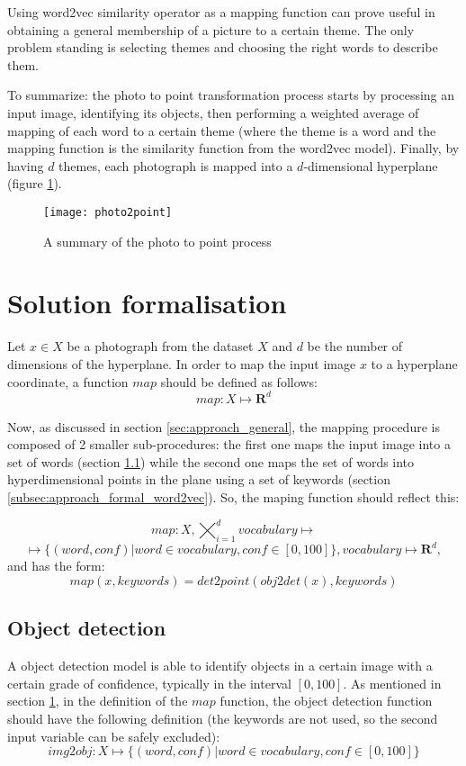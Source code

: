 Using word2vec similarity operator as a mapping function can prove useful in obtaining a general membership of a picture to a certain theme. The only problem standing is selecting themes and choosing the right words to describe them.

To summarize: the photo to point transformation process starts by processing an input image, identifying its objects, then performing a weighted average of mapping of each word to a certain theme (where the theme is a word and the mapping function is the similarity function from the word2vec model). Finally, by having $d$ themes, each photograph is mapped into a $d$-dimensional hyperplane (figure \ref{fig:photo2point}).

\begin{figure}[b!]
\centering
\texttt{[image: photo2point]}
\caption{A summary of the photo to point process}
\label{fig:photo2point}
\end{figure}

\section{Solution formalisation}
\label{sec:approach_formal}

Let $x \in X$ be a photograph from the dataset $X$ and $d$ be the number of dimensions of the hyperplane. In order to map the input image $x$ to a hyperplane coordinate, a function $map$ should be defined as follows:
$$ map : X \mapsto \mathbf{R}^{d} $$

Now, as discussed in section \ref{sec:approach_general}, the mapping procedure is composed of 2 smaller sub-procedures: the first one maps the input image into a set of words (section \ref{subsec:approach_formal_obj}) while the second one maps the set of words into hyperdimensional points in the plane using a set of keywords (section \ref{subsec:approach_formal_word2vec}). So, the maping function  should reflect this:

$$ map : X, \bigtimes_{i=1}^{d}{vocabulary} \mapsto $$ $$ \mapsto \{(word, conf) | word \in vocabulary, conf \in [0, 100]\}, vocabulary \mapsto \mathbf{R}^{d} ,$$
and has the form:
$$ map(x, keywords) = det2point(obj2det(x), keywords) $$

\subsection{Object detection}
\label{subsec:approach_formal_obj}

A object detection model is able to identify objects in a certain image with a certain grade of confidence, typically in the interval $[0, 100]$. As mentioned in section \ref{sec:approach_formal}, in the definition of the $map$ function, the object detection function should have the following definition (the keywords are not used, so the second input variable can be safely excluded):
$$ img2obj : X \mapsto \{(word, conf) | word \in vocabulary, conf \in [0, 100]\} $$

